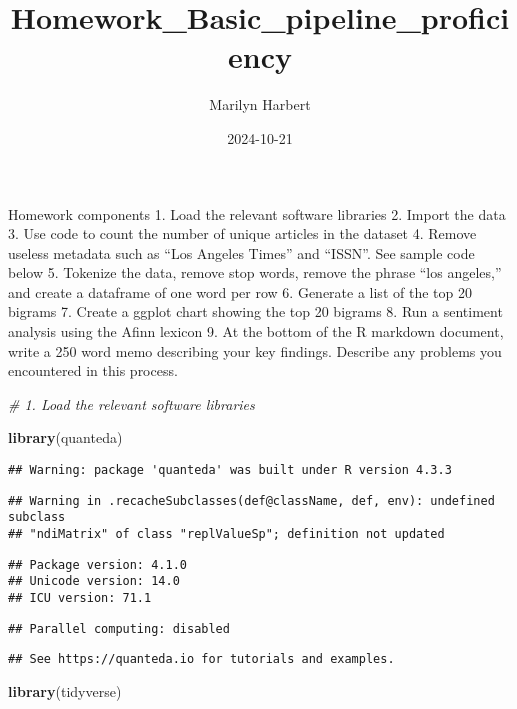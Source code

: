 \documentclass[
]{article}
\title{Homework\_Basic\_pipeline\_proficiency}
\author{Marilyn Harbert}
\date{2024-10-21}
\newenvironment{Shaded}{\begin{snugshade}}{\end{snugshade}}
\newcommand{\CommentTok}[1]{\textcolor[rgb]{0.56,0.35,0.01}{\textit{#1}}}
\newcommand{\FunctionTok}[1]{\textcolor[rgb]{0.13,0.29,0.53}{\textbf{#1}}}
\newcommand{\NormalTok}[1]{#1}
\begin{document}
\maketitle

Homework components 1. Load the relevant software libraries 2. Import
the data 3. Use code to count the number of unique articles in the
dataset 4. Remove useless metadata such as ``Los Angeles Times'' and
``ISSN''. See sample code below 5. Tokenize the data, remove stop words,
remove the phrase ``los angeles,'' and create a dataframe of one word
per row 6. Generate a list of the top 20 bigrams 7. Create a ggplot
chart showing the top 20 bigrams 8. Run a sentiment analysis using the
Afinn lexicon 9. At the bottom of the R markdown document, write a 250
word memo describing your key findings. Describe any problems you
encountered in this process.

\begin{Shaded}
\begin{Highlighting}[]
\CommentTok{\# 1. Load the relevant software libraries}

\FunctionTok{library}\NormalTok{(quanteda)}
\end{Highlighting}
\end{Shaded}

\begin{verbatim}
## Warning: package 'quanteda' was built under R version 4.3.3
\end{verbatim}

\begin{verbatim}
## Warning in .recacheSubclasses(def@className, def, env): undefined subclass
## "ndiMatrix" of class "replValueSp"; definition not updated
\end{verbatim}

\begin{verbatim}
## Package version: 4.1.0
## Unicode version: 14.0
## ICU version: 71.1
\end{verbatim}

\begin{verbatim}
## Parallel computing: disabled
\end{verbatim}

\begin{verbatim}
## See https://quanteda.io for tutorials and examples.
\end{verbatim}

\begin{Shaded}
\begin{Highlighting}[]
\FunctionTok{library}\NormalTok{(tidyverse)}
\end{Highlighting}
\end{Shaded}
\end{document}
